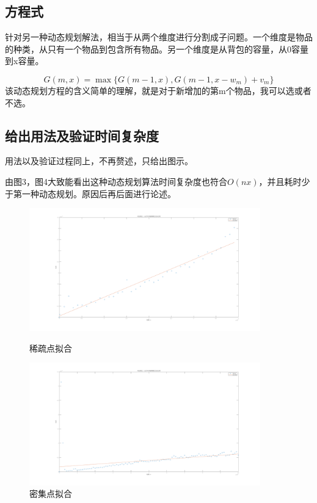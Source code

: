 \documentclass[UTF8]{ctexart}
\begin{document}
\subsection{方程式}
针对另一种动态规划解法，相当于从两个维度进行分割成子问题。一个维度是物品的种类，从只有一个物品到包含所有物品。另一个维度是从背包的容量，从0容量到x容量。

\[G(m,x) = \max\{ G(m-1,x), G(m-1,x-w_m) + v_m \} \]
该动态规划方程的含义简单的理解，就是对于新增加的第m个物品，我可以选或者不选。

\subsection{给出用法及验证时间复杂度}
用法以及验证过程同上，不再赘述，只给出图示。

由图3，图4大致能看出这种动态规划算法时间复杂度也符合\( O(nx) \)，并且耗时少于第一种动态规划。原因后再后面进行论述。
\begin{figure}[H] %
    \centering
    \begin{minipage}[t]{1\textwidth}
        \centering
        \includegraphics[width=10cm]{3.png}
        \caption{稀疏点拟合}
    \end{minipage}
    \begin{minipage}[t]{1\textwidth}
        \centering
        \includegraphics[width=10cm]{4.png}
        \caption{密集点拟合}
    \end{minipage}
\end{figure}
\end{document}
